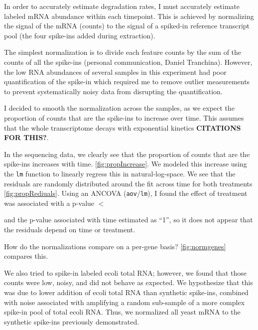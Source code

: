 \label{subsec:4tuNormalization}

In order to accurately estimate degradation rates, I must accurately
estimate labeled mRNA abundance within each timepoint. This is
achieved by normalizing the signal of the mRNA (counts) to the signal
of a spiked-in reference transcript pool (the four spike-ins added
during extraction).

The simplest normalization is to divide each feature counts
by the sum of the counts of all the spike-ins (personal communication,
Daniel Tranchina). However, the low RNA abundances of several 
samples in this experiment had poor quantification of the spike-in 
which required me to remove outlier measurements to prevent 
systematically noisy data from
disrupting the quantification. 

I decided to smooth the normalization across the samples, as we expect
the proportion of counts that are the spike-ins to increase over time.
This assumes that the whole transcriptome decays with exponential
kinetics \textbf{CITATIONS FOR THIS?}.

In the sequencing data, we clearly see that the proportion of counts
that are the spike-ins increases with time.
\autoref{fig:propIncrease}.
We modeled this increase using the \texttt{lm} function to linearly
regress this in natural-log-space. We see that
the residuals are randomly distributed around the fit across time 
for both treatments \autoref{fig:propRediuals}.
Using an ANCOVA (\texttt{aov}/\texttt{lm}), I found the effect of 
treatment was associated with a p-value \(<\)

and the p-value
associated with time estimated as ``1'', so it does not appear that the
residuals depend on time or treatment.


How do the normalizations compare on a per-gene basis? 
\ref{fig:normgenes} compares this.



We also tried to spike-in labeled ecoli total RNA; however, we found
that those counts were low, noisy, and did not behave as expected. We
hypothesize that this was due to lower addition of ecoli total RNA than
synthetic spike-ins, combined with noise associated with amplifying a
random sub-sample of a more complex spike-in pool of total ecoli RNA.
Thus, we normalized all yeast mRNA to the synthetic spike-ins previously
demonstrated.

